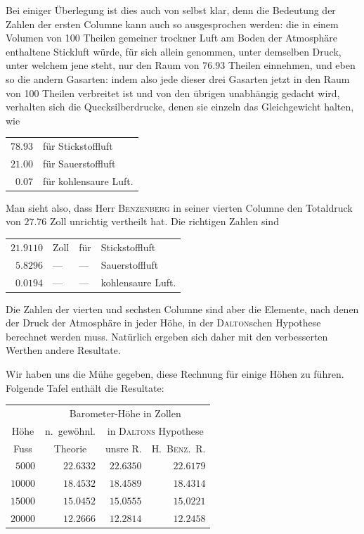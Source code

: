 Bei einiger Überlegung ist dies auch von selbst klar, denn die Bedeutung der Zahlen der ersten Columne kann auch so ausgesprochen werden: die in einem Volumen von 100 Theilen gemeiner trockner Luft am Boden der Atmosphäre enthaltene Stickluft würde, für sich allein genommen, unter demselben Druck, unter welchem jene steht, nur den Raum von $76.93$ Theilen einnehmen, und eben
so die andern Gasarten: indem also jede dieser drei Gasarten jetzt in den Raum von 100 Theilen verbreitet ist und von den übrigen unabhängig gedacht wird, verhalten sich die Quecksilberdrucke, denen sie einzeln das Gleichgewicht halten, wie
\begin{center}\begin{tabular}{rl}
$78.93$ & für Stickstoffluft\\
$21.00$ & für Sauerstoffluft\\
$0.07$ & für kohlensaure Luft.
\end{tabular}\end{center}

Man sieht also, dass Herr \textsc{Benzenberg} in seiner vierten Columne den Totaldruck von $27.76$ Zoll unrichtig vertheilt hat. Die richtigen Zahlen sind
\begin{center}\begin{tabular}{rlll}
$21.9110$ & Zoll & für & Stickstoffluft\\
$5.8296$ & — & — & Sauerstoffluft\\
$0.0194$ & — & — & kohlensaure Luft.
\end{tabular}\end{center}
Die Zahlen der vierten und sechsten Columne sind aber die Elemente, nach denen der Druck der Atmosphäre in jeder Höhe, in der \textsc{Dalton}schen Hypothese berechnet werden muss. Natürlich ergeben sich daher mit den verbesserten Werthen andere Resultate.

Wir haben uns die Mühe gegeben, diese Rechnung für einige Höhen zu führen. Folgende Tafel enthält die Resultate:
\begin{center}\begin{tabular}{r|r|r|r}
& \multicolumn{3}{c}{Barometer-Höhe in Zollen}\\
\multicolumn{1}{c|}{Höhe} & \multicolumn{1}{c|}{n.\ gewöhnl.} & \multicolumn{2}{c}{in \textsc{Daltons} Hypothese}\\
\multicolumn{1}{c|}{Fuss} & \multicolumn{1}{c|}{Theorie} & \multicolumn{1}{c|}{unsre R.} & \multicolumn{1}{c}{H.\ \textsc{Benz}.\ R.}\\\hline
$5000$ & $22.6332$ & $22.6350$ & $22.6179$\\
$10000$ & $18.4532$ & $18.4589$ & $18.4314$\\
$15000$ & $15.0452$ & $15.0555$ & $15.0221$\\
$20000$ & $12.2666$ & $12.2814$ & $12.2458$
\end{tabular}\end{center}

